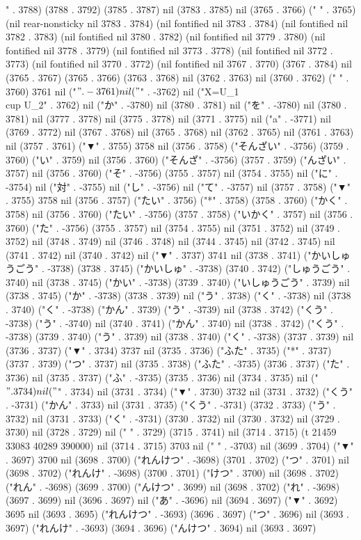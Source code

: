 {" . 3788) (3788 . 3792) (3785 . 3787) nil (3783 . 3785) nil (3765 . 3766) ("  " . 3765) (nil rear-nonsticky nil 3783 . 3784) (nil fontified nil 3783 . 3784) (nil fontified nil 3782 . 3783) (nil fontified nil 3780 . 3782) (nil fontified nil 3779 . 3780) (nil fontified nil 3778 . 3779) (nil fontified nil 3773 . 3778) (nil fontified nil 3772 . 3773) (nil fontified nil 3770 . 3772) (nil fontified nil 3767 . 3770) (3767 . 3784) nil (3765 . 3767) (3765 . 3766) (3763 . 3768) nil (3762 . 3763) nil (3760 . 3762) (" " . 3760) 3761 nil ("$" . -3761) nil ("$" . -3762) nil ("X=U_{1}\\cup U_{2}" . 3762) nil ("か" . -3780) nil (3780 . 3781) nil ("を" . -3780) nil (3780 . 3781) nil (3777 . 3778) nil (3775 . 3778) nil (3771 . 3775) nil ("a" . -3771) nil (3769 . 3772) nil (3767 . 3768) nil (3765 . 3768) nil (3762 . 3765) nil (3761 . 3763) nil (3757 . 3761) ("▼" . 3755) 3758 nil (3756 . 3758) ("そんざい" . -3756) (3759 . 3760) ("い" . 3759) nil (3756 . 3760) ("そんざ" . -3756) (3757 . 3759) ("んざい" . 3757) nil (3756 . 3760) ("そ" . -3756) (3755 . 3757) nil (3754 . 3755) nil ("に" . -3754) nil ("対" . -3755) nil ("し" . -3756) nil ("て" . -3757) nil (3757 . 3758) ("▼" . 3755) 3758 nil (3756 . 3757) ("たい" . 3756) ("*" . 3758) (3758 . 3760) ("かく" . 3758) nil (3756 . 3760) ("たい" . -3756) (3757 . 3758) ("いかく" . 3757) nil (3756 . 3760) ("た" . -3756) (3755 . 3757) nil (3754 . 3755) nil (3751 . 3752) nil (3749 . 3752) nil (3748 . 3749) nil (3746 . 3748) nil (3744 . 3745) nil (3742 . 3745) nil (3741 . 3742) nil (3740 . 3742) nil ("▼" . 3737) 3741 nil (3738 . 3741) ("かいしゅうごう" . -3738) (3738 . 3745) ("かいしゅ" . -3738) (3740 . 3742) ("しゅうごう" . 3740) nil (3738 . 3745) ("かい" . -3738) (3739 . 3740) ("いしゅうごう" . 3739) nil (3738 . 3745) ("か" . -3738) (3738 . 3739) nil ("う" . 3738) ("く" . -3738) nil (3738 . 3740) ("く" . -3738) ("かん" . 3739) ("う" . -3739) nil (3738 . 3742) ("くう" . -3738) ("う" . -3740) nil (3740 . 3741) ("かん" . 3740) nil (3738 . 3742) ("くう" . -3738) (3739 . 3740) ("う" . 3739) nil (3738 . 3740) ("く" . -3738) (3737 . 3739) nil (3736 . 3737) ("▼" . 3734) 3737 nil (3735 . 3736) ("ふた" . 3735) ("*" . 3737) (3737 . 3739) ("つ" . 3737) nil (3735 . 3738) ("ふた" . -3735) (3736 . 3737) ("た" . 3736) nil (3735 . 3737) ("ふ" . -3735) (3735 . 3736) nil (3734 . 3735) nil ("$" . 3734) nil ("$" . 3734) nil (3731 . 3734) ("▼" . 3730) 3732 nil (3731 . 3732) ("くう" . -3731) ("かん" . 3733) nil (3731 . 3735) ("くう" . -3731) (3732 . 3733) ("う" . 3732) nil (3731 . 3733) ("く" . -3731) (3730 . 3732) nil (3730 . 3732) nil (3729 . 3730) nil (3728 . 3729) nil (" " . 3729) (3715 . 3741) nil (3714 . 3715) (t 21459 33083 40289 390000) nil (3714 . 3715) 3703 nil (" " . -3703) nil (3699 . 3704) ("▼" . 3697) 3700 nil (3698 . 3700) ("れんけつ" . -3698) (3701 . 3702) ("つ" . 3701) nil (3698 . 3702) ("れんけ" . -3698) (3700 . 3701) ("けつ" . 3700) nil (3698 . 3702) ("れん" . -3698) (3699 . 3700) ("んけつ" . 3699) nil (3698 . 3702) ("れ" . -3698) (3697 . 3699) nil (3696 . 3697) nil ("あ" . -3696) nil (3694 . 3697) ("▼" . 3692) 3695 nil (3693 . 3695) ("れんけつ" . -3693) (3696 . 3697) ("つ" . 3696) nil (3693 . 3697) ("れんけ" . -3693) (3694 . 3696) ("んけつ" . 3694) nil (3693 . 3697) }
